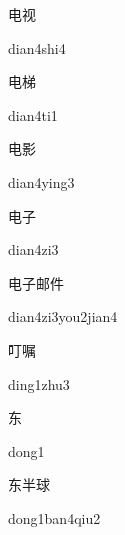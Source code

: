 \begin{multicols*}{2}
\begin{verbete}{电视}
\begin{pronuncia}{dian4shi4}
\end{pronuncia}
\end{verbete}

\begin{verbete}[dian4ti1]{电梯}
\begin{pronuncia}{dian4ti1}
\end{pronuncia}
\end{verbete}

\begin{verbete}{电影}
\begin{pronuncia}{dian4ying3}
\end{pronuncia}
\end{verbete}

\begin{verbete}[dian4zi3]{电子}
\begin{pronuncia}{dian4zi3}
\end{pronuncia}
\end{verbete}

\begin{verbete}{电子邮件}
\begin{pronuncia}{dian4zi3you2jian4}
\end{pronuncia}
\end{verbete}

\begin{verbete}{叮嘱}
\begin{pronuncia}{ding1zhu3}
\end{pronuncia}
\end{verbete}

\begin{verbete}[dong1]{东}
\begin{pronuncia}{dong1}
\end{pronuncia}
\end{verbete}

\begin{verbete}{东半球}
\begin{pronuncia}{dong1ban4qiu2}
\end{pronuncia}
\end{verbete}


\end{multicols*}

